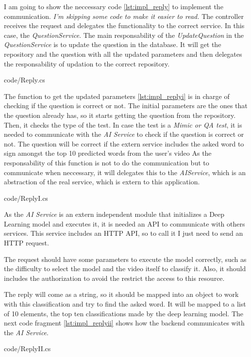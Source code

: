     I am going to show the neccessary code \ref{lst:impl_reply} to implement the communication. \textit{I'm skipping some code to make it easier to read.}
    The controller receives the request and delegates the functionality to the correct service. In this case, the \textit{QuestionService}. 
    The main responsability of the \textit{UpdateQuestion} in the \textit{QuestionService} is to update the question in the database. It will get the 
    repository and the question with all the updated parameters and then delegates the responsability of updation to the correct repository. 
    
    {code/Reply.cs}

    The function to get the updated parameters \ref{lst:impl_replyi} is in charge of checking if the question is correct or not. The initial parameters are 
    the ones that the question already has, so it starts getting the question from the repository. Then, it checks the type of the test. In case the test is 
    a \textit{Mimic or QA test}, it is needed to communicate with the \textit{AI Service} to check if the question is correct or not. 
    The question will be correct if the extern service includes the asked word to sign amongst the top 10 predicted words from the user's video 
    As the responsability of this function is not to do the communication but to communicate when neccessary, 
    it will delegates this to the \textit{AIService}, which is an abstraction of the real service, which is extern to this application. 
    
    {code/ReplyI.cs}

    As the \textit{AI Service} is an extern independent module that initializes a Deep Learning model and executes it, it is needed an API to 
    communicate with others services. This service includes an HTTP API, so to call it I just need to send an HTTP request. 
    
    The request should have some parameters to execute the model correctly, such as the difficulty to select the model and the video itself to classify it. 
    Also, it should includes the authorization to avoid the restrict the access to this resource. 

    The reply will come as a string, so it should be mapped into an object to work with this classification and try to find the asked word. It will be mapped to a list 
    of 10 elements, the top ten classifications made by the deep learning model. The next code fragment \ref{lst:impl_replyii} shows how the backend communicates 
    with the \textit{AI Service}.
    
    {code/ReplyII.cs}


